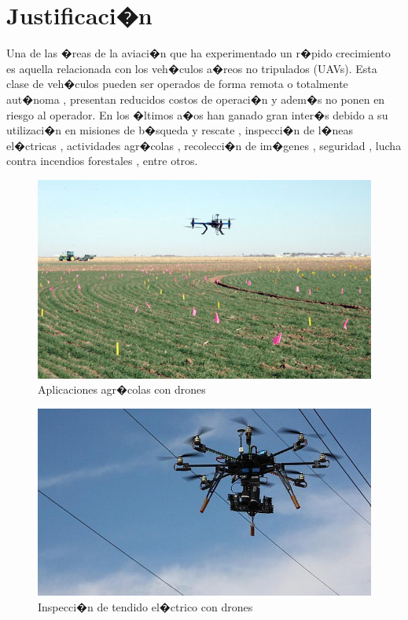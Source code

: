\newpage
\section{Justificaci�n}
\label{cap0:sec:justificacion}


Una de las �reas de la aviaci�n que ha experimentado un r�pido crecimiento es aquella relacionada con los veh�culos a�reos no tripulados (UAVs). Esta clase de veh�culos pueden ser operados de forma remota o totalmente aut�noma , presentan reducidos costos de  %
operaci�n y adem�s no ponen en riesgo al operador. En los �ltimos a�os han ganado gran inter�s debido a su utilizaci�n en misiones de b�squeda y rescate %
, inspecci�n de l�neas el�ctricas %
, actividades agr�colas %
, recolecci�n de im�genes %
, seguridad %
, lucha contra incendios forestales %
, entre otros.

\begin{figure}[h!]
	\centering
	\includegraphics[width=0.7\linewidth, height=0.2\textheight]{Imagenes/dron_apli_1}
	\caption{Aplicaciones agr�colas con drones}
	\label{fig:dronapli1}
\end{figure}


\begin{figure}[h!]
	\centering
	\includegraphics[width=0.7\linewidth, height=0.2\textheight]{Imagenes/drone_apli_2}
	\caption{Inspecci�n de tendido el�ctrico con drones}
	\label{fig:droneapli2}
\end{figure}

